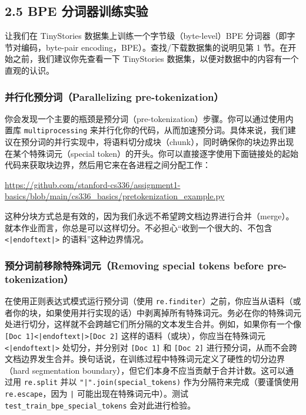 \subsection*{2.5 BPE 分词器训练实验}

让我们在 TinyStories 数据集上训练一个字节级（byte-level）BPE 分词器（即字节对编码，byte-pair encoding，BPE）。查找/下载数据集的说明见第 1 节。在开始之前，我们建议你先查看一下 TinyStories 数据集，以便对数据中的内容有一个直观的认识。

\subsubsection*{并行化预分词（Parallelizing pre-tokenization）}

你会发现一个主要的瓶颈是预分词（pre-tokenization）步骤。你可以通过使用内置库 \texttt{multiprocessing} 来并行化你的代码，从而加速预分词。具体来说，我们建议在预分词的并行实现中，将语料切分成块（chunk），同时确保你的块边界出现在某个特殊词元（special token）的开头。你可以直接逐字使用下面链接处的起始代码来获取块边界，然后用它来在各进程之间分配工作：

\begin{center}
\url{https://github.com/stanford-cs336/assignment1-basics/blob/main/cs336_basics/pretokenization_example.py}
\end{center}

这种分块方式总是有效的，因为我们永远不希望跨文档边界进行合并（merge）。就本作业而言，你总是可以这样切分。不必担心“收到一个很大的、不包含 \texttt{<|endoftext|>} 的语料”这种边界情况。

\subsubsection*{预分词前移除特殊词元（Removing special tokens before pre-tokenization）}

在使用正则表达式模式运行预分词（使用 \texttt{re.finditer}）之前，你应当从语料（或者你的块，如果使用并行实现的话）中剥离掉所有特殊词元。务必在你的特殊词元处进行切分，这样就不会跨越它们所分隔的文本发生合并。例如，如果你有一个像 \texttt{[Doc 1]<|endoftext|>[Doc 2]} 这样的语料（或块），你应当在特殊词元 \texttt{<|endoftext|>} 处切分，并分别对 \texttt{[Doc 1]} 和 \texttt{[Doc 2]} 进行预分词，从而不会跨文档边界发生合并。换句话说，在训练过程中特殊词元定义了硬性的切分边界（hard segmentation boundary），但它们本身不应当贡献于合并计数。这可以通过用 \texttt{re.split} 并以 \texttt{"|".join(special\_tokens)} 作为分隔符来完成（要谨慎使用 \texttt{re.escape}，因为 \texttt{|} 可能出现在特殊词元中）。测试 \texttt{test\_train\_bpe\_special\_tokens} 会对此进行检验。

